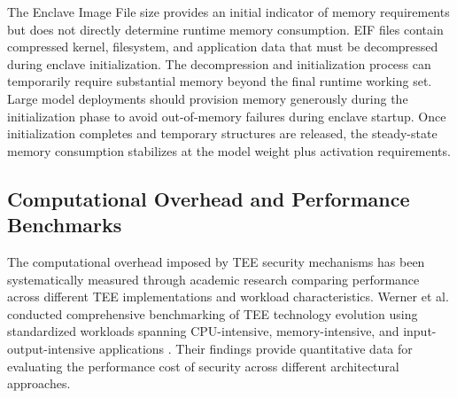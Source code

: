 The Enclave Image File size provides an initial indicator of memory requirements but does not directly determine runtime memory consumption. EIF files contain compressed kernel, filesystem, and application data that must be decompressed during enclave initialization. The decompression and initialization process can temporarily require substantial memory beyond the final runtime working set. Large model deployments should provision memory generously during the initialization phase to avoid out-of-memory failures during enclave startup. Once initialization completes and temporary structures are released, the steady-state memory consumption stabilizes at the model weight plus activation requirements.

\subsection{Computational Overhead and Performance Benchmarks}

The computational overhead imposed by TEE security mechanisms has been systematically measured through academic research comparing performance across different TEE implementations and workload characteristics. Werner et al. conducted comprehensive benchmarking of TEE technology evolution using standardized workloads spanning CPU-intensive, memory-intensive, and input-output-intensive applications \cite{tee_evolution}. Their findings provide quantitative data for evaluating the performance cost of security across different architectural approaches.

